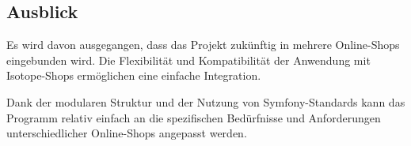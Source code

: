 \subsection{Ausblick}
\label{sec:Ausblick}

Es wird davon ausgegangen, dass das Projekt zukünftig in mehrere Online-Shops eingebunden wird. Die Flexibilität und Kompatibilität der Anwendung mit Isotope-Shops ermöglichen eine einfache Integration.

Dank der modularen Struktur und der Nutzung von Symfony-Standards kann das Programm relativ einfach an die spezifischen Bedürfnisse und Anforderungen unterschiedlicher Online-Shops angepasst werden.